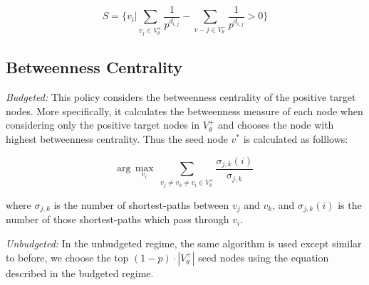 \begin{equation}
S = \{ v_i |  \sum_{v_j \in V_\theta^+} \frac{1}{p^{d_{i,j}}} -  \sum_{v-j \in V_{\theta}^-} \frac{1}{p^{d_{i,j}}} > 0 \}
\end{equation}

\subsection{Betweenness Centrality}
\textit{Budgeted:}
This policy considers the betweenness centrality of the positive target nodes. More specifically, it calculates the betweenness measure of each node when considering only the positive target nodes in $V_\theta^+$ and chooses the node with highest betweenness centrality. Thus the seed node $v^*$ is calculated as folllows:

\begin{equation}
	\text{arg}\,\max\limits_{v_i}\  \sum_{v_j \neq v_k \neq v_i  \in V_\theta^+} \frac{\sigma_{j,k}(i)}{\sigma_{j,k}}
\end{equation}

where $\sigma_{j,k}$ is the number of shortest-paths between $v_j$ and $v_k$, and $\sigma_{j,k}(i)$ is the number of those shortest-paths which pass through $v_i$.

\textit{Unbudgeted:}
In the unbudgeted regime, the same algorithm is used except similar to before, we choose the top $(1-p) \cdot |V_\theta^+|$ seed nodes using the equation described in the budgeted regime.




